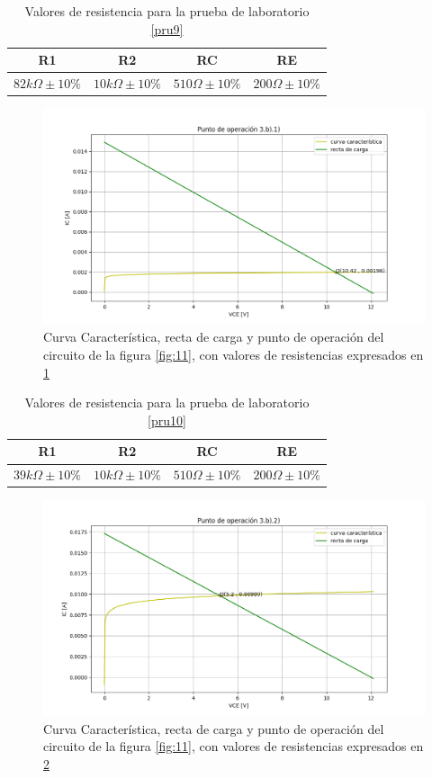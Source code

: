\documentclass[10pt, a4paper]{article}
\begin{document}
    \newpage

    \begin{table}[h!]
        \centering
        \caption{Valores de resistencia para la prueba de laboratorio \ref{pru9}}
        \label{tab:3b1}
        \begin{tabular}{|c|c|c|c|} \hline
            R1 & R2 & RC & RE \\ \hline
            $82k\Omega \pm 10\%$ & $10k\Omega \pm 10\%$ & $510\Omega \pm 10\%$ & $200\Omega \pm 10\%$ \\ \hline
        \end{tabular}
    \end{table}

    \begin{figure}[h!]
        \centering
        \includegraphics[height=5cm\textwidth]{3b1.png}
        \caption{Curva Característica, recta de carga y punto de operación del circuito de la figura \ref{fig:11}, con valores de resistencias expresados en \ref{tab:3b1}}
        \label{fig:3b1}
    \end{figure}

    \begin{table}[h!]
        \centering
        \caption{Valores de resistencia para la prueba de laboratorio \ref{pru10}}
        \label{tab:3b2}
        \begin{tabular}{|c|c|c|c|} \hline
            R1 & R2 & RC & RE \\ \hline
            $39k\Omega \pm 10\%$ & $10k\Omega \pm 10\%$ & $510\Omega \pm 10\%$ & $200\Omega \pm 10\%$ \\ \hline
        \end{tabular}
    \end{table}

    \begin{figure}[h!]
        \centering
        \includegraphics[height=5cm\textwidth]{3b2.png}
        \caption{Curva Característica, recta de carga y punto de operación del circuito de la figura \ref{fig:11}, con valores de resistencias expresados en \ref{tab:3b2}}
        \label{fig:3b2}
    \end{figure}
\end{document}
